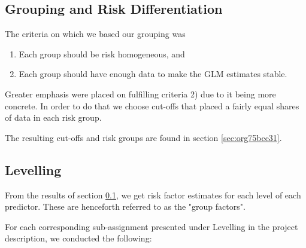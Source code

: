 \documentclass[11pt]{article}
\begin{document}
\subsection{Grouping and Risk Differentiation}
\label{sec:orgfdd43b7}

The criteria on which we based our grouping was

\begin{enumerate}
\item Each group should be risk homogeneous, and
\item Each group should have enough data to make the GLM estimates stable.
\end{enumerate}
Greater emphasis were placed on fulfilling criteria 2) due to it being more concrete. In order to do that
we choose cut-offs that placed a fairly equal shares of data in each risk group. 

The resulting cut-offs and risk groups are found in section \ref{sec:org75bcc31}.

\subsection{Levelling}
\label{sec:org9d5918c}

From the results of section \ref{sec:orgfdd43b7}, we get risk factor estimates for each
level of each predictor. These are henceforth referred to as the "group factors".

For each corresponding sub-assignment presented under Levelling in the project description, we conducted the
following:
\end{document}
